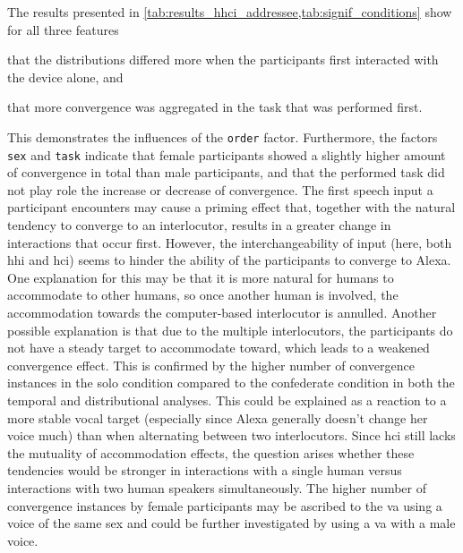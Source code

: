 The results presented in \cref{tab:results_hhci_addressee,tab:signif_conditions} show for all three features
\begin{enumerate*}[(a)]
	\item that the distributions differed more when the participants first interacted with the device alone, and
	\item that more convergence was aggregated in the task that was performed first.
\end{enumerate*}
This demonstrates the influences of the \texttt{order} factor.
Furthermore, the factors \texttt{sex} and \texttt{task} indicate that female participants showed a slightly higher amount of convergence in total than male participants, and that the performed task did not play role the increase or decrease of convergence.
The first speech input a participant encounters may cause a priming effect that, together with the natural tendency to converge to an interlocutor, results in a greater change in interactions that occur first.
However, the interchangeability of input (here, both \ac{hhi} and \ac{hci}) seems to hinder the ability of the participants to converge to Alexa.
One explanation for this may be that it is more natural for humans to accommodate to other humans, so once another human is involved, the accommodation towards the computer-based interlocutor is annulled.
Another possible explanation is that due to the multiple interlocutors, the participants do not have a steady target to accommodate toward, which leads to a weakened convergence effect.
This is confirmed by the higher number of convergence instances in the solo condition compared to the confederate condition in both the temporal and distributional analyses.
This could be explained as a reaction to a more stable vocal target (especially since Alexa generally doesn't change her voice much) than when alternating between two interlocutors.
Since \ac{hci} still lacks the mutuality of accommodation effects, the question arises whether these tendencies would be stronger in interactions with a single human versus interactions with two human speakers simultaneously.
The higher number of convergence instances by female participants may be ascribed to the \ac{va} using a voice of the same sex and could be further investigated by using a \ac{va} with a male voice.

